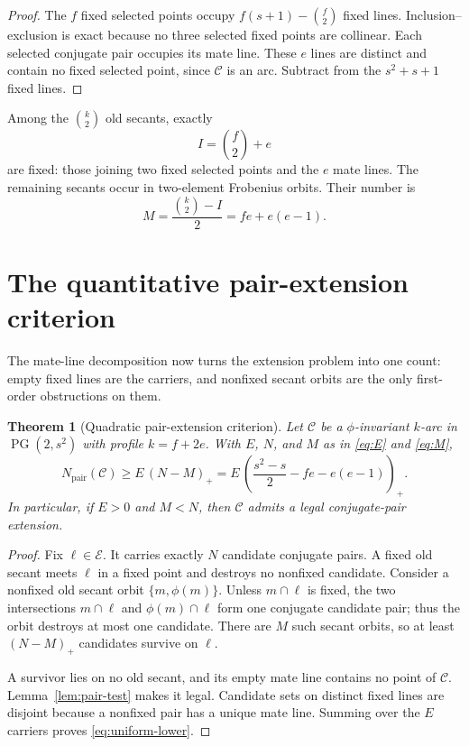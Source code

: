 \documentclass[11pt]{article}
\newtheorem{theorem}{Theorem}[section]
\theoremstyle{definition}
\theoremstyle{remark}
\newcommand{\PG}{\operatorname{PG}}
\newcommand{\cC}{\mathcal{C}}
\newcommand{\cE}{\mathcal{E}}
\newcommand{\Npair}{N_{\mathrm{pair}}}
\newcommand{\pospart}[1]{\left(#1\right)_{+}}
\begin{document}
\begin{proof}
The $f$ fixed selected points occupy
$f(s+1)-\binom f2$ fixed lines.  Inclusion--exclusion is exact because no
three selected fixed points are collinear.  Each selected conjugate pair
occupies its mate line.  These $e$ lines are distinct and contain no fixed
selected point, since $\cC$ is an arc.  Subtract from the $s^2+s+1$ fixed
lines.
\end{proof}

Among the $\binom k2$ old secants, exactly
\[
 I=\binom f2+e
\]
are fixed: those joining two fixed selected points and the $e$ mate lines.
The remaining secants occur in two-element Frobenius orbits.  Their number
is
\begin{equation}\label{eq:M}
 M=\frac{\binom k2-I}{2}=fe+e(e-1).
\end{equation}

\section{The quantitative pair-extension criterion}

The mate-line decomposition now turns the extension problem into one count:
empty fixed lines are the carriers, and nonfixed secant orbits are the only
first-order obstructions on them.

\begin{theorem}[Quadratic pair-extension criterion]
\label{thm:pair-criterion}
Let $\cC$ be a $\phi$-invariant $k$-arc in $\PG(2,s^2)$ with profile
$k=f+2e$.  With $E$, $N$, and $M$ as in
\eqref{eq:E} and \eqref{eq:M},
\begin{equation}\label{eq:uniform-lower}
  \Npair(\cC)\ge E\,\pospart{N-M}
  =E\,\pospart{\frac{s^2-s}{2}-fe-e(e-1)}.
\end{equation}
In particular, if $E>0$ and $M<N$, then $\cC$ admits a legal conjugate-pair
extension.
\end{theorem}

\begin{proof}
Fix $\ell\in\cE$.  It carries exactly $N$ candidate conjugate pairs.  A
fixed old secant meets $\ell$ in a fixed point and destroys no nonfixed
candidate.  Consider a nonfixed old secant orbit $\{m,\phi(m)\}$.  Unless
$m\cap\ell$ is fixed, the two intersections $m\cap\ell$ and
$\phi(m)\cap\ell$ form one conjugate candidate pair; thus the orbit destroys
at most one candidate.  There are $M$ such secant orbits, so at least
$\pospart{N-M}$ candidates survive on $\ell$.

A survivor lies on no old secant, and its empty mate line contains no point
of $\cC$.  Lemma~\ref{lem:pair-test} makes it legal.  Candidate sets on
distinct fixed lines are disjoint because a nonfixed pair has a unique mate
line.  Summing over the $E$ carriers proves \eqref{eq:uniform-lower}.
\end{proof}
\end{document}
